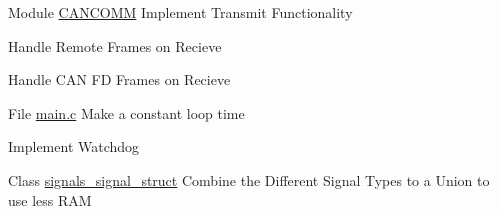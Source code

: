 
\begin{DoxyRefList}
\item[Module \mbox{\hyperlink{group___c_a_n_c_o_m_m}{CANCOMM}} ]\label{todo__todo000001}%
%
Implement Transmit Functionality 



Handle Remote Frames on Recieve 



Handle CAN FD Frames on Recieve 


\item[File \mbox{\hyperlink{main_8c}{main.c}} ]\label{todo__todo000003}%
%
Make a constant loop time 



Implement Watchdog 
\item[Class \mbox{\hyperlink{structsignals__signal__struct}{signals\+\_\+signal\+\_\+struct}} ]\label{todo__todo000002}%
%
Combine the Different Signal Types to a Union to use less RAM
\end{DoxyRefList}